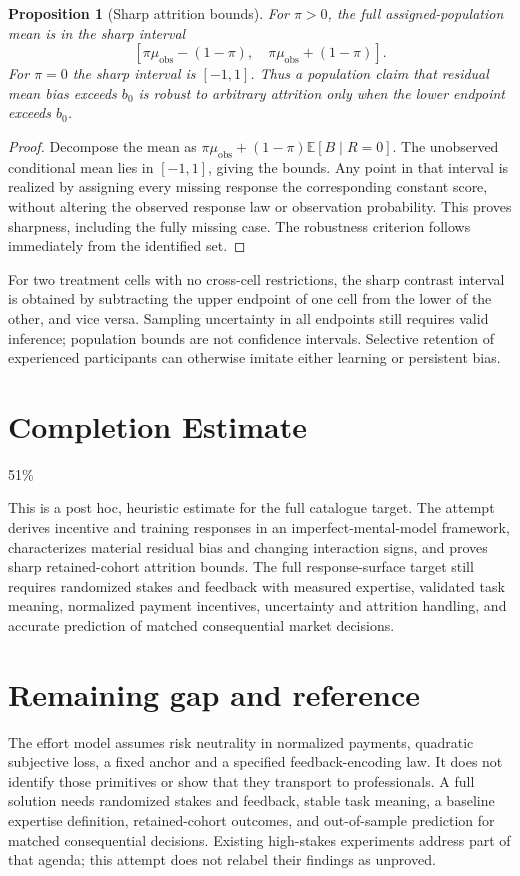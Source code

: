 \documentclass[11pt,a4paper]{article}
\newtheorem{proposition}[theorem]{Proposition}
\theoremstyle{definition}
\theoremstyle{remark}
\newcommand{\E}{\mathbb{E}}
\begin{document}
\begin{proposition}[Sharp attrition bounds]
For $\pi>0$, the full assigned-population mean is in the sharp interval
\[
 [\pi\mu_{\mathrm{obs}}-(1-\pi),\quad
   \pi\mu_{\mathrm{obs}}+(1-\pi)].\tag{3}
\]
For $\pi=0$ the sharp interval is $[-1,1]$. Thus a population claim that residual mean bias exceeds $b_0$ is robust to arbitrary attrition only when the lower endpoint exceeds $b_0$.
\end{proposition}
\begin{proof}
Decompose the mean as $\pi\mu_{\mathrm{obs}}+(1-\pi)\E[B\mid R=0]$. The unobserved conditional mean lies in $[-1,1]$, giving the bounds. Any point in that interval is realized by assigning every missing response the corresponding constant score, without altering the observed response law or observation probability. This proves sharpness, including the fully missing case. The robustness criterion follows immediately from the identified set.
\end{proof}

For two treatment cells with no cross-cell restrictions, the sharp contrast interval is obtained by subtracting the upper endpoint of one cell from the lower of the other, and vice versa. Sampling uncertainty in all endpoints still requires valid inference; population bounds are not confidence intervals. Selective retention of experienced participants can otherwise imitate either learning or persistent bias.

\section{Completion Estimate}
51\%

This is a post hoc, heuristic estimate for the full catalogue target.
The attempt derives incentive and training responses in an imperfect-mental-model framework, characterizes material residual bias and changing interaction signs, and proves sharp retained-cohort attrition bounds. The full response-surface target still requires randomized stakes and feedback with measured expertise, validated task meaning, normalized payment incentives, uncertainty and attrition handling, and accurate prediction of matched consequential market decisions.

\section{Remaining gap and reference}
The effort model assumes risk neutrality in normalized payments, quadratic subjective loss, a fixed anchor and a specified feedback-encoding law. It does not identify those primitives or show that they transport to professionals. A full solution needs randomized stakes and feedback, stable task meaning, a baseline expertise definition, retained-cohort outcomes, and out-of-sample prediction for matched consequential decisions. Existing high-stakes experiments address part of that agenda; this attempt does not relabel their findings as unproved.
\end{document}
